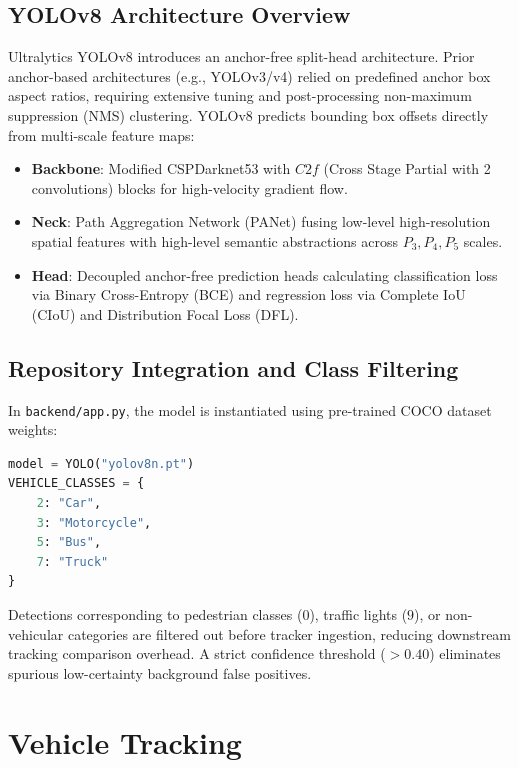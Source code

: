 \documentclass[11pt,a4paper,oneside]{report}
\begin{document}
\section{YOLOv8 Architecture Overview}
Ultralytics YOLOv8 introduces an anchor-free split-head architecture. Prior anchor-based architectures (e.g., YOLOv3/v4) relied on predefined anchor box aspect ratios, requiring extensive tuning and post-processing non-maximum suppression (NMS) clustering. YOLOv8 predicts bounding box offsets directly from multi-scale feature maps:
\begin{itemize}[leftmargin=*]
    \item \textbf{Backbone}: Modified CSPDarknet53 with $C2f$ (Cross Stage Partial with 2 convolutions) blocks for high-velocity gradient flow.
    \item \textbf{Neck}: Path Aggregation Network (PANet) fusing low-level high-resolution spatial features with high-level semantic abstractions across $P_3, P_4, P_5$ scales.
    \item \textbf{Head}: Decoupled anchor-free prediction heads calculating classification loss via Binary Cross-Entropy (BCE) and regression loss via Complete IoU (CIoU) and Distribution Focal Loss (DFL).
\end{itemize}

\section{Repository Integration and Class Filtering}
In \texttt{backend/app.py}, the model is instantiated using pre-trained COCO dataset weights:
\begin{lstlisting}[language=Python]
model = YOLO("yolov8n.pt")
VEHICLE_CLASSES = {
    2: "Car",
    3: "Motorcycle",
    5: "Bus",
    7: "Truck"
}
\end{lstlisting}
Detections corresponding to pedestrian classes ($0$), traffic lights ($9$), or non-vehicular categories are filtered out before tracker ingestion, reducing downstream tracking comparison overhead. A strict confidence threshold ($> 0.40$) eliminates spurious low-certainty background false positives.



\chapter{Vehicle Tracking}
\end{document}
